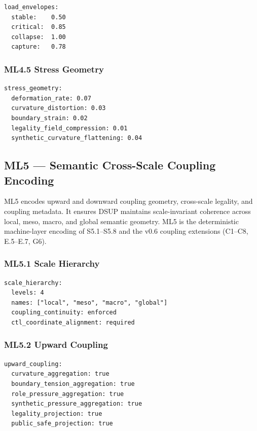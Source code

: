 \begin{verbatim}
load_envelopes:
  stable:    0.50
  critical:  0.85
  collapse:  1.00
  capture:   0.78
\end{verbatim}
\subsubsection*{ML4.5 Stress Geometry}

\begin{verbatim}
stress_geometry:
  deformation_rate: 0.07
  curvature_distortion: 0.03
  boundary_strain: 0.02
  legality_field_compression: 0.01
  synthetic_curvature_flattening: 0.04
\end{verbatim}


\subsection*{ML5 — Semantic Cross-Scale Coupling Encoding}

ML5 encodes upward and downward coupling geometry, cross-scale legality, and
coupling metadata. It ensures DSUP maintains scale-invariant coherence across
local, meso, macro, and global semantic geometry. ML5 is the deterministic
machine-layer encoding of S5.1–S5.8 and the v0.6 coupling extensions (C1–C8,
E.5–E.7, G6).

\subsubsection*{ML5.1 Scale Hierarchy}

\begin{verbatim}
scale_hierarchy:
  levels: 4
  names: ["local", "meso", "macro", "global"]
  coupling_continuity: enforced
  ctl_coordinate_alignment: required
\end{verbatim}
\subsubsection*{ML5.2 Upward Coupling}

\begin{verbatim}
upward_coupling:
  curvature_aggregation: true
  boundary_tension_aggregation: true
  role_pressure_aggregation: true
  synthetic_pressure_aggregation: true
  legality_projection: true
  public_safe_projection: true
\end{verbatim}
